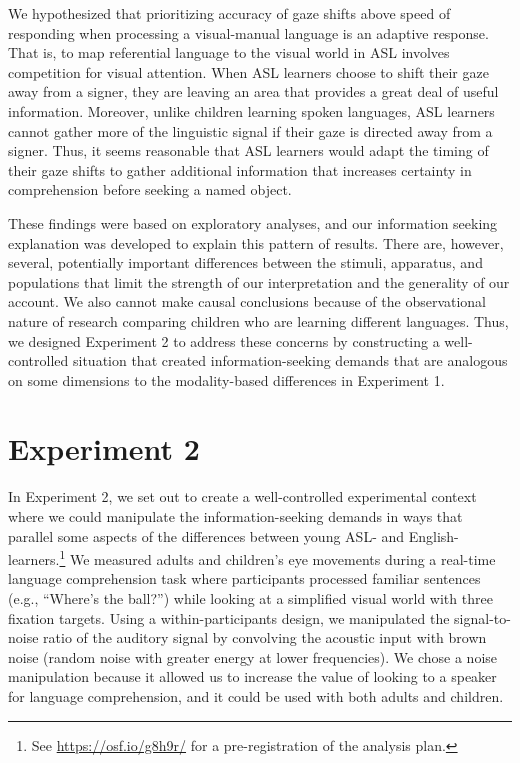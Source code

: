 \documentclass[,man,floatsintext]{apa6}
\let\rmarkdownfootnote\footnote%
\def\footnote{\protect\rmarkdownfootnote}
\begin{document}
We hypothesized that prioritizing accuracy of gaze shifts above speed of
responding when processing a visual-manual language is an adaptive
response. That is, to map referential language to the visual world in
ASL involves competition for visual attention. When ASL learners choose
to shift their gaze away from a signer, they are leaving an area that
provides a great deal of useful information. Moreover, unlike children
learning spoken languages, ASL learners cannot gather more of the
linguistic signal if their gaze is directed away from a signer. Thus, it
seems reasonable that ASL learners would adapt the timing of their gaze
shifts to gather additional information that increases certainty in
comprehension before seeking a named object.

These findings were based on exploratory analyses, and our information
seeking explanation was developed to explain this pattern of results.
There are, however, several, potentially important differences between
the stimuli, apparatus, and populations that limit the strength of our
interpretation and the generality of our account. We also cannot make
causal conclusions because of the observational nature of research
comparing children who are learning different languages. Thus, we
designed Experiment 2 to address these concerns by constructing a
well-controlled situation that created information-seeking demands that
are analogous on some dimensions to the modality-based differences in
Experiment 1.

\section{Experiment 2}\label{experiment-2}

In Experiment 2, we set out to create a well-controlled experimental
context where we could manipulate the information-seeking demands in
ways that parallel some aspects of the differences between young ASL-
and English-learners.\footnote{See \url{https://osf.io/g8h9r/} for a
  pre-registration of the analysis plan.} We measured adults and
children's eye movements during a real-time language comprehension task
where participants processed familiar sentences (e.g., \enquote{Where's
the ball?}) while looking at a simplified visual world with three
fixation targets. Using a within-participants design, we manipulated the
signal-to-noise ratio of the auditory signal by convolving the acoustic
input with brown noise (random noise with greater energy at lower
frequencies). We chose a noise manipulation because it allowed us to
increase the value of looking to a speaker for language comprehension,
and it could be used with both adults and children.
\end{document}
